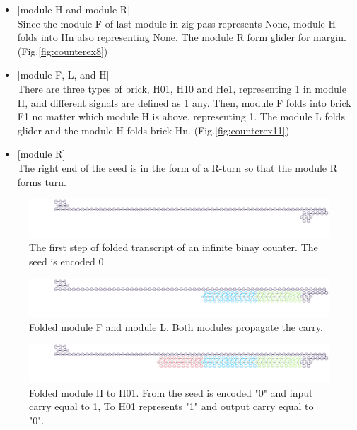 \documentclass[runningheads]{llncs}
\begin{document}
\begin{itemize}
\item{[module H and module R]} \\Since the module F of last module in zig pass represents None,
module H folds into Hn also representing None. The module R form glider for margin. (Fig.\ref{fig:counterex8})

\item{[module F, L, and H]} \\There are three types of brick, H01, H10 and He1, representing 1 in module H, and different signals are defined as 1 any. Then, module F folds into brick F1 no matter which module H is above, representing 1. The module L folds glider and the module H folds brick Hn. (Fig.\ref{fig:counterex11})

\item{[module R]} \\The right end of the seed is in the form of a R-turn so that the module R forms turn.

\end{itemize}
\begin{figure}[tb]
\centering
\includegraphics[width=\linewidth]{fig/svg/CounterEx0.pdf}
\caption{
The first step of folded transcript of an infinite binay counter. The seed is encoded 0.
}
\label{fig:counterex0}
\end{figure}

\begin{figure}[tb]
\centering
\includegraphics[width=\linewidth]{fig/svg/CounterEx2.pdf}
\caption{
Folded module F and module L. Both modules propagate the carry.
}
\label{fig:counterex2}
\end{figure}

\begin{figure}[tb]
\centering
\includegraphics[width=\linewidth]{fig/svg/CounterEx3.pdf}
\caption{
Folded module H to H01. From the seed is encoded "0" and input carry equal to 1, To H01 represents "1" and output carry equal to "0".
}
\label{fig:counterex3}
\end{figure}
\end{document}
